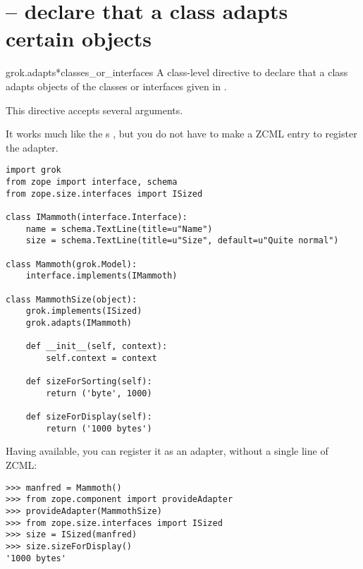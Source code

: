     \section{ -- declare that a class adapts
      certain objects}

        \begin{funcdesc}{grok.adapts}{*classes_or_interfaces}
          A class-level directive to declare that a class adapts
          objects of the classes or interfaces given in
          .

          This directive accepts several arguments.

          It works much like the s
          , but you do not have to make a ZCML
          entry to register the adapter.


          \begin{verbatim}
import grok
from zope import interface, schema
from zope.size.interfaces import ISized

class IMammoth(interface.Interface):
    name = schema.TextLine(title=u"Name")
    size = schema.TextLine(title=u"Size", default=u"Quite normal")

class Mammoth(grok.Model):
    interface.implements(IMammoth)

class MammothSize(object):
    grok.implements(ISized)
    grok.adapts(IMammoth)

    def __init__(self, context):
        self.context = context

    def sizeForSorting(self):
        return ('byte', 1000)

    def sizeForDisplay(self):
        return ('1000 bytes')
          \end{verbatim}

          Having  available, you can register it as
          an adapter, without a single line of ZCML:

          \begin{verbatim}
>>> manfred = Mammoth()
>>> from zope.component import provideAdapter
>>> provideAdapter(MammothSize)
>>> from zope.size.interfaces import ISized
>>> size = ISized(manfred)
>>> size.sizeForDisplay()
'1000 bytes'
          \end{verbatim}

          \begin{seealso}
          \end{seealso}

        \end{funcdesc}

